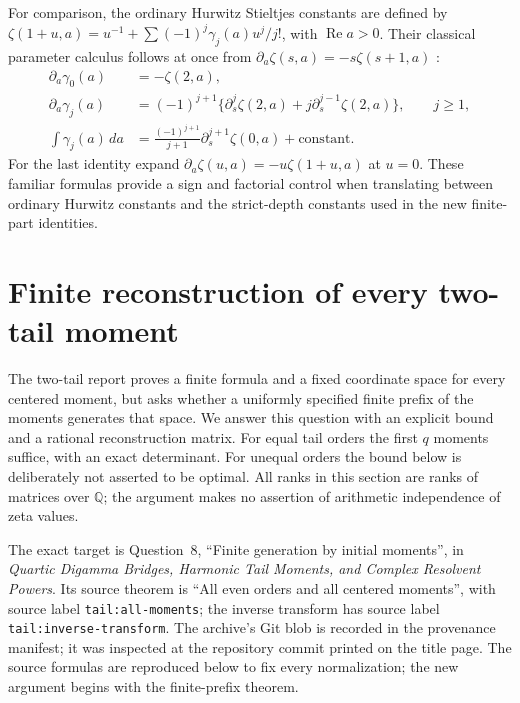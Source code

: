 \documentclass[11pt,a4paper]{article}
\numberwithin{equation}{section}
\theoremstyle{definition}
\newcommand{\re}{\operatorname{Re}}
\begin{document}
For comparison, the ordinary Hurwitz Stieltjes constants are defined
by $\zeta(1+u,a)=u^{-1}+\sum(-1)^j\gamma_j(a)u^j/j!$,
with $\re a>0$. Their classical parameter calculus follows at once
from $\partial_a\zeta(s,a)=-s\zeta(s+1,a)$ \cite{DLMF}:
\begin{align}
 \partial_a\gamma_0(a)&=-\zeta(2,a),\\
 \partial_a\gamma_j(a)&=(-1)^{j+1}
     \{\partial_s^j\zeta(2,a)+j\partial_s^{j-1}\zeta(2,a)\},
       \qquad j\ge1,\label{eq:hurwitz_derivative}\\
 \int\gamma_j(a)\,da
     &=\frac{(-1)^{j+1}}{j+1}
                       \partial_s^{j+1}\zeta(0,a)+\text{constant}.
 \label{eq:hurwitz_primitive}
\end{align}
For the last identity expand
$\partial_a\zeta(u,a)=-u\zeta(1+u,a)$ at $u=0$.
These familiar formulas provide a sign and factorial control when
translating between ordinary Hurwitz constants and the strict-depth
constants used in the new finite-part identities.


\section{Finite reconstruction of every two-tail moment}
\label{tr:section}

The two-tail report proves a finite formula and a fixed coordinate space
for every centered moment, but asks whether a uniformly specified finite
prefix of the moments generates that space. We answer this question with
an explicit bound and a rational reconstruction matrix. For equal tail
orders the first $q$ moments suffice, with an exact determinant. For
unequal orders the bound below is deliberately not asserted to be optimal.
All ranks in this section are ranks of matrices over $\mathbb Q$; the
argument makes no assertion of arithmetic independence of zeta values.

The exact target is Question~8, ``Finite generation by initial moments'',
in \emph{Quartic Digamma Bridges, Harmonic Tail Moments, and Complex Resolvent Powers}. Its source theorem is
``All even orders and all centered moments'', with source label
\texttt{tail:all-moments}; the inverse transform has source label
\texttt{tail:inverse-transform}. The archive's Git blob is recorded
in the provenance manifest; it was inspected at the repository
commit printed on the title page.
The source formulas are reproduced below to fix every normalization;
the new argument begins with the finite-prefix theorem.
\end{document}
